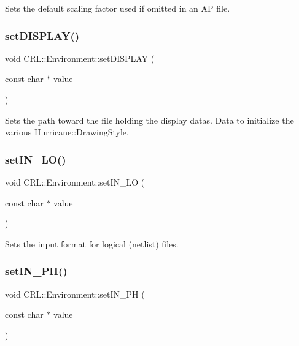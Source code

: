 Sets the default scaling factor used if omitted in an AP file. \mbox{\label{classCRL_1_1Environment_a69416219076a00900f58d0d5e0ac55a9}} 
\subsubsection{\texorpdfstring{set\+D\+I\+S\+P\+L\+A\+Y()}{setDISPLAY()}}
{\footnotesize\ttfamily void C\+R\+L\+::\+Environment\+::set\+D\+I\+S\+P\+L\+AY (\begin{DoxyParamCaption}\item[{const char $\ast$}]{value }\end{DoxyParamCaption})\hspace{0.3cm}{\ttfamily [inline]}}

Sets the path toward the file holding the display datas. Data to initialize the various Hurricane\+::\+Drawing\+Style. \mbox{\label{classCRL_1_1Environment_ad204e8f425d3a35bba494a60d4b4ff69}} 
\subsubsection{\texorpdfstring{set\+I\+N\+\_\+\+L\+O()}{setIN\_LO()}}
{\footnotesize\ttfamily void C\+R\+L\+::\+Environment\+::set\+I\+N\+\_\+\+LO (\begin{DoxyParamCaption}\item[{const char $\ast$}]{value }\end{DoxyParamCaption})\hspace{0.3cm}{\ttfamily [inline]}}

Sets the input format for logical (netlist) files. \mbox{\label{classCRL_1_1Environment_a62965d987f17d2853afd44004ff20b1b}} 
\subsubsection{\texorpdfstring{set\+I\+N\+\_\+\+P\+H()}{setIN\_PH()}}
{\footnotesize\ttfamily void C\+R\+L\+::\+Environment\+::set\+I\+N\+\_\+\+PH (\begin{DoxyParamCaption}\item[{const char $\ast$}]{value }\end{DoxyParamCaption})\hspace{0.3cm}{\ttfamily [inline]}}

